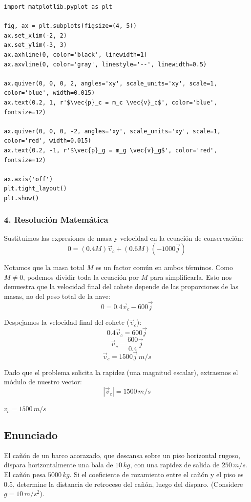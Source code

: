 \documentclass[12pt, a4paper]{article}
\begin{document}
\begin{lstlisting}
import matplotlib.pyplot as plt

fig, ax = plt.subplots(figsize=(4, 5))
ax.set_xlim(-2, 2)
ax.set_ylim(-3, 3)
ax.axhline(0, color='black', linewidth=1)
ax.axvline(0, color='gray', linestyle='--', linewidth=0.5)

ax.quiver(0, 0, 0, 2, angles='xy', scale_units='xy', scale=1, color='blue', width=0.015)
ax.text(0.2, 1, r'$\vec{p}_c = m_c \vec{v}_c$', color='blue', fontsize=12)

ax.quiver(0, 0, 0, -2, angles='xy', scale_units='xy', scale=1, color='red', width=0.015)
ax.text(0.2, -1, r'$\vec{p}_g = m_g \vec{v}_g$', color='red', fontsize=12)

ax.axis('off')
plt.tight_layout()
plt.show()
\end{lstlisting}

\subsubsection*{4. Resolución Matemática}
Sustituimos las expresiones de masa y velocidad en la ecuación de conservación:
\[ 0 = (0.4 M) \vec{v}_c + (0.6 M) (-1000 \vec{j}) \]

Notamos que la masa total $M$ es un factor común en ambos términos. Como $M \neq 0$, podemos dividir toda la ecuación por $M$ para simplificarla. Esto nos demuestra que la velocidad final del cohete depende de las proporciones de las masas, no del peso total de la nave:
\[ 0 = 0.4 \vec{v}_c - 600 \vec{j} \]

Despejamos la velocidad final del cohete ($\vec{v}_c$):
\[ 0.4 \vec{v}_c = 600 \vec{j} \]
\[ \vec{v}_c = \frac{600}{0.4} \vec{j} \]
\[ \vec{v}_c = 1500 \vec{j} \, \si{m/s} \]

Dado que el problema solicita la rapidez (una magnitud escalar), extraemos el módulo de nuestro vector:
\[ |\vec{v}_c| = 1500 \, \si{m/s} \]

\begin{tcolorbox}[colback=green!5!white, colframe=green!50!black, title=Respuesta Final]
\centering \Large $v_c = 1500 \, \si{m/s}$
\end{tcolorbox}

\newpage

\subsection*{Enunciado}
El cañón de un barco acorazado, que descansa sobre un piso horizontal rugoso, dispara horizontalmente una bala de $10 \, \si{kg}$, con una rapidez de salida de $250 \, \si{m/s}$. El cañón pesa $5000 \, \si{kg}$. Si el coeficiente de rozamiento entre el cañón y el piso es $0.5$, determine la distancia de retroceso del cañón, luego del disparo. (Considere $g = 10 \, \si{m/s^2}$).
\end{document}
